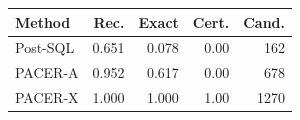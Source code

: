 \begin{tabular}{lrrrr}
\toprule
Method & Rec. & Exact & Cert. & Cand.\\
\midrule
Post-SQL & 0.651 & 0.078 & 0.00 & 162\\
PACER-A & 0.952 & 0.617 & 0.00 & 678\\
PACER-X & 1.000 & 1.000 & 1.00 & 1270\\
\bottomrule
\end{tabular}
